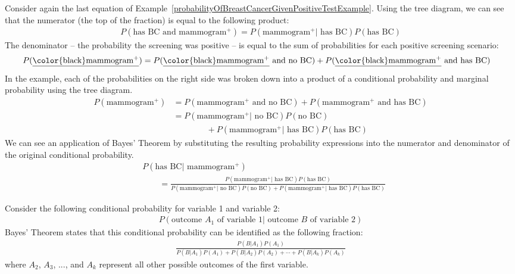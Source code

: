 Consider again the last equation of Example~\ref{probabilityOfBreastCancerGivenPositiveTestExample}.
Using the tree diagram, we can see that the numerator (the top of the fraction) is equal to the following product:
\begin{align*}
P(\text{has BC and mammogram$^+$}) = P(\text{mammogram$^+$} | \text{ has BC})P(\text{has BC})
\end{align*}
The denominator -- the probability the screening was positive -- is equal to the sum of probabilities for each positive screening scenario:
\begin{align*}
P(\text{\underline{\color{black}mammogram$^+$}})
	&= P(\text{\underline{\color{black}mammogram$^+$} and no BC})
		+ P(\text{\underline{\color{black}mammogram$^+$} and has BC})
\end{align*}
In the example, each of the probabilities on the right side was broken down into a product of a conditional probability and marginal probability using the tree diagram.
\begin{align*}
P(\text{mammogram$^+$})
	&= P(\text{mammogram$^+$ and no BC}) + P(\text{mammogram$^+$ and has BC}) \\
	&= P(\text{mammogram$^+$} | \text{ no BC})P(\text{no BC}) \\
			   &\qquad\qquad + P(\text{mammogram$^+$} | \text{ has BC})P(\text{has BC})
\end{align*}
We can see an application of Bayes' Theorem by substituting the resulting probability expressions into the numerator and denominator of the original conditional probability.
\begin{align*}
& P(\text{has BC} | \text{ mammogram$^+$})  \\
& \qquad= \frac{P(\text{mammogram$^+$} | \text{ has BC})P(\text{has BC})}
	{P(\text{mammogram$^+$} | \text{ no BC})P(\text{no BC}) + P(\text{mammogram$^+$} | \text{ has BC})P(\text{has BC})}
\end{align*}

\begin{termBox}{
Consider the following conditional probability for variable 1 and variable 2:\vspace{-1.5mm}
\begin{align*}
P(\text{outcome $A_1$ of variable 1} | \text{ outcome $B$ of variable 2})
\end{align*}
Bayes' Theorem states that this conditional probability can be identified as the following fraction:\vspace{-1.5mm}
\begin{align}
\frac{P(B | A_1) P(A_1)}
	{P(B | A_1) P(A_1) + P(B | A_2) P(A_2) + \cdots + P(B | A_k) P(A_k)}
	\label{equationOfBayesTheorem}
\end{align}
where $A_2$, $A_3$, ..., and $A_k$ represent all other possible outcomes of the first variable.}
\end{termBox}

